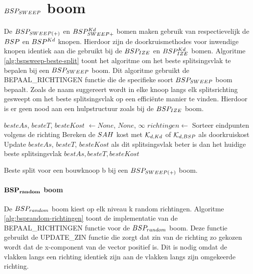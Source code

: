 \section{$BSP_{SWEEP}$ boom}
\label{sec:h4-bspsweep}
De $BSP_{SWEEP(+)}$ en $BSP^{Kd}_{SWEEP+}$ bomen maken gebruik van respectievelijk de $BSP$ en $BSP^{Kd}$ knopen.
Hierdoor zijn de doorkruismethodes voor inwendige knopen identiek aan die gebruikt bij de $BSP_{IZE}$ en $BSP^{Kd}_{IZE}$ bomen.
Algoritme \ref{alg:bspsweep-beste-split} toont het algoritme om het beste splitsingsvlak te bepalen bij een $BSP_{SWEEP}$ boom.
Dit algoritme gebruikt de BEPAAL\_RICHTINGEN functie die de specifieke soort $BSP_{SWEEP}$ boom bepaalt.
Zoals de naam suggereert wordt in elke knoop langs elk splitsrichting gesweept om het beste splitsingsvlak op een efficiënte manier te vinden.
Hierdoor is er geen nood aan een hulpstructuur zoals bij de $BSP_{IZE}$ boom.

\begin{dutchalgorithm}
    \begin{algorithmic}       
            \State $besteAs$, $besteT$, $besteKost$ $\gets None$, $None$, $\infty$
            \State $richtingen \gets $ 
                \State Sorteer eindpunten volgens de richting
                    \State Bereken de $SAH$ kost met $\mathcal{K}_{d,Kd}$ of $\mathcal{K}_{d,BSP}$ als doorkruiskost
                    \State Update $besteAs$, $besteT$, $besteKost$ als dit splitsingsvlak beter is dan het huidige beste splitsingsvlak
                \EndFor     
            \EndFor
            \State \Return $bestAs, besteT, besteKost$
        \EndFunction
    \end{algorithmic}
    \caption{Beste split voor een bouwknoop b bij een $BSP_{SWEEP(+)}$  boom.}
    \label{alg:bspsweep-beste-split}
\end{dutchalgorithm}

\paragraph{$\mathbf{BSP_{random}}$ boom}
De $BSP_{random}$ boom kiest op elk niveau k random richtingen.
Algoritme \ref{alg:bsprandom-richtingen} toont de implementatie van de BEPAAL\_RICHTINGEN functie voor de $BSP_{random}$ boom. 
Deze functie gebruikt de UPDATE\_ZIN functie die zorgt dat zin van de richting zo gekozen wordt dat de x-component van de vector positief is.
Dit is nodig omdat de vlakken langs een richting identiek zijn aan de vlakken langs zijn omgekeerde richting.

